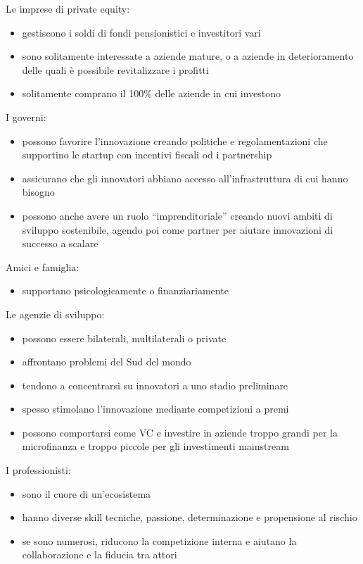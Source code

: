 \documentclass[answers, a4paper, 11pt]{exam}
\begin{document}
Le imprese di private equity:

\begin{itemize}
    \item gestiscono i soldi di fondi pensionistici e investitori vari
    \item sono solitamente interessate a aziende mature, o a aziende in deterioramento delle quali è possibile revitalizzare i profitti
    \item solitamente comprano il 100\% delle aziende in cui investono
\end{itemize}

I governi:

\begin{itemize}
    \item possono favorire l'innovazione creando politiche e regolamentazioni che supportino le startup con incentivi fiscali od i partnership
    \item assicurano che gli innovatori abbiano accesso all'infrastruttura di cui hanno bisogno
    \item possono anche avere un ruolo ``imprenditoriale'' creando nuovi ambiti di sviluppo sostenibile, agendo poi come partner per aiutare innovazioni di successo a scalare
\end{itemize}

Amici e famiglia:

\begin{itemize}
    \item supportano psicologicamente o finanziariamente
\end{itemize}

Le agenzie di sviluppo:

\begin{itemize}
    \item possono essere bilaterali, multilaterali o private
    \item affrontano problemi del Sud del mondo
    \item tendono a concentrarsi su innovatori a uno stadio preliminare
    \item spesso stimolano l'innovazione mediante competizioni a premi
    \item possono comportarsi come VC e investire in aziende troppo grandi per la microfinanza e troppo piccole per gli investimenti mainstream
\end{itemize}

I professionisti:

\begin{itemize}
    \item sono il cuore di un'ecosistema
    \item hanno diverse skill tecniche, passione, determinazione e propensione al rischio
    \item se sono numerosi, riducono la competizione interna e aiutano la collaborazione e la fiducia tra attori
\end{itemize}
\end{document}
